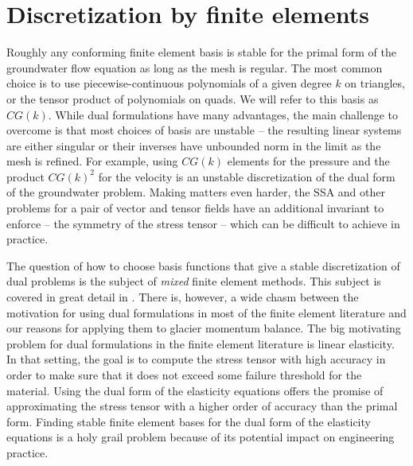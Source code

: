 \documentclass{article}
\theoremstyle{definition}
\theoremstyle{plain}
\begin{document}
\appendix

\section{Discretization by finite elements}
\label{app:discretization}

Roughly any conforming finite element basis is stable for the primal form of the groundwater flow equation as long as the mesh is regular.
The most common choice is to use piecewise-continuous polynomials of a given degree $k$ on triangles, or the tensor product of polynomials on quads.
We will refer to this basis as $CG(k)$.
While dual formulations have many advantages, the main challenge to overcome is that most choices of basis are unstable -- the resulting linear systems are either singular or their inverses have unbounded norm in the limit as the mesh is refined.
For example, using $CG(k)$ elements for the pressure and the product $CG(k)^2$ for the velocity is an unstable discretization of the dual form of the groundwater problem.
Making matters even harder, the SSA and other problems for a pair of vector and tensor fields have an additional invariant to enforce -- the symmetry of the stress tensor -- which can be difficult to achieve in practice.

The question of how to choose basis functions that give a stable discretization of dual problems is the subject of \emph{mixed} finite element methods.
This subject is covered in great detail in \citet{boffi2013mixed}.
There is, however, a wide chasm between the motivation for using dual formulations in most of the finite element literature and our reasons for applying them to glacier momentum balance.
The big motivating problem for dual formulations in the finite element literature is linear elasticity.
In that setting, the goal is to compute the stress tensor with high accuracy in order to make sure that it does not exceed some failure threshold for the material.
Using the dual form of the elasticity equations offers the promise of approximating the stress tensor with a higher order of accuracy than the primal form.
Finding stable finite element bases for the dual form of the elasticity equations is a holy grail problem because of its potential impact on engineering practice.
\end{document}
